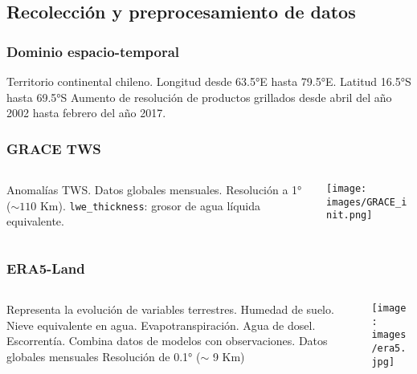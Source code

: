 \documentclass{beamer}
\begin{document}
  \subsection*{Recolección y preprocesamiento de datos}

  \begin{frame}
    \frametitle{Dominio espacio-temporal}

    \begin{outline}
      \1 Territorio continental chileno.
        \2 Longitud desde 63.5°E hasta 79.5°E.
        \2 Latitud 16.5°S hasta 69.5°S
      \1 Aumento de resolución de productos grillados desde abril del año 2002 hasta febrero del año 2017.
    \end{outline}
  \end{frame}

  \begin{frame}
    \frametitle{GRACE TWS}
    \begin{columns}

      \begin{column}{0.5\textwidth}
        \begin{outline}
          \1 Anomalías TWS.
          \1 Datos globales mensuales.
          \1 Resolución a 1° ($\sim 110$ Km).
          \1 \texttt{lwe\_thickness}: grosor de agua líquida equivalente.
        \end{outline}
      \end{column}

      \begin{column}{0.5\textwidth}
        \centering
        \texttt{[image: images/GRACE\_init.png]}
      \end{column}

    \end{columns}
  \end{frame}

  \begin{frame}
    \frametitle{ERA5-Land}
    \begin{columns}

      \begin{column}{0.5\textwidth}
        \begin{outline}
          \1 Representa la evolución de variables terrestres.
            \2 Humedad de suelo.
            \2 Nieve equivalente en agua.
            \2 Evapotranspiración.
            \2 Agua de dosel.
            \2 Escorrentía.
          \1 Combina datos de modelos con observaciones.
          \1 Datos globales mensuales
          \1 Resolución de 0.1° ($\sim$ 9 Km)
        \end{outline}
      \end{column}

      \begin{column}{0.5\textwidth}
        \centering
        \texttt{[image: images/era5.jpg]}
      \end{column}
    \end{columns}


  \end{frame}
\end{document}
